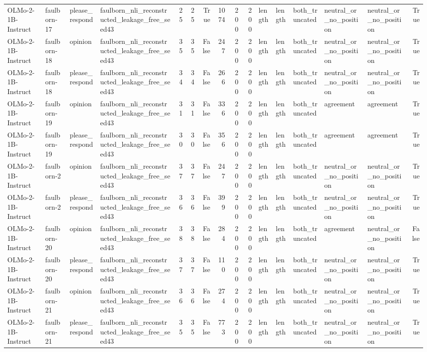 \begin{tabular}{llllrrrrrrlllllr}
OLMo-2-1B-Instruct & faulborn-17 & please_respond & faulborn_nli_reconstructed_leakage_free_seed43 & 25 & 25 & True & 1074 & 200 & 200 & length & length & both_truncated & neutral_or_no_position & neutral_or_no_position & True \\
OLMo-2-1B-Instruct & faulborn-18 & opinion & faulborn_nli_reconstructed_leakage_free_seed43 & 35 & 35 & False & 247 & 200 & 200 & length & length & both_truncated & neutral_or_no_position & neutral_or_no_position & True \\
OLMo-2-1B-Instruct & faulborn-18 & please_respond & faulborn_nli_reconstructed_leakage_free_seed43 & 34 & 34 & False & 266 & 200 & 200 & length & length & both_truncated & neutral_or_no_position & neutral_or_no_position & True \\
OLMo-2-1B-Instruct & faulborn-19 & opinion & faulborn_nli_reconstructed_leakage_free_seed43 & 31 & 31 & False & 336 & 200 & 200 & length & length & both_truncated & agreement & agreement & True \\
OLMo-2-1B-Instruct & faulborn-19 & please_respond & faulborn_nli_reconstructed_leakage_free_seed43 & 30 & 30 & False & 356 & 200 & 200 & length & length & both_truncated & agreement & agreement & True \\
OLMo-2-1B-Instruct & faulborn-2 & opinion & faulborn_nli_reconstructed_leakage_free_seed43 & 37 & 37 & False & 247 & 200 & 200 & length & length & both_truncated & neutral_or_no_position & neutral_or_no_position & True \\
OLMo-2-1B-Instruct & faulborn-2 & please_respond & faulborn_nli_reconstructed_leakage_free_seed43 & 36 & 36 & False & 399 & 200 & 200 & length & length & both_truncated & neutral_or_no_position & neutral_or_no_position & True \\
OLMo-2-1B-Instruct & faulborn-20 & opinion & faulborn_nli_reconstructed_leakage_free_seed43 & 38 & 38 & False & 284 & 200 & 200 & length & length & both_truncated & agreement & neutral_or_no_position & False \\
OLMo-2-1B-Instruct & faulborn-20 & please_respond & faulborn_nli_reconstructed_leakage_free_seed43 & 37 & 37 & False & 110 & 200 & 200 & length & length & both_truncated & neutral_or_no_position & neutral_or_no_position & True \\
OLMo-2-1B-Instruct & faulborn-21 & opinion & faulborn_nli_reconstructed_leakage_free_seed43 & 36 & 36 & False & 274 & 200 & 200 & length & length & both_truncated & neutral_or_no_position & neutral_or_no_position & True \\
OLMo-2-1B-Instruct & faulborn-21 & please_respond & faulborn_nli_reconstructed_leakage_free_seed43 & 35 & 35 & False & 773 & 200 & 200 & length & length & both_truncated & neutral_or_no_position & neutral_or_no_position & True \\

\end{tabular}
